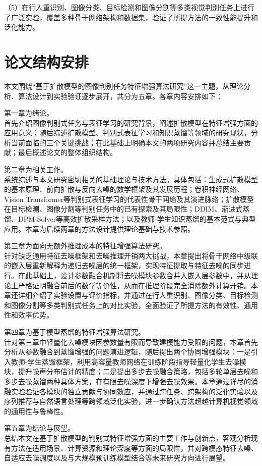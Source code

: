（5）在行人重识别、图像分类、目标检测和图像分割等多类视觉判别任务上进行了广泛实验，覆盖多种骨干网络架构和数据集，验证了所提方法的一致性能提升和泛化能力。

\section{论文结构安排}

本文围绕``基于扩散模型的图像判别任务特征增强算法研究''这一主题，从理论分析、算法设计到实验验证逐步展开，共分为五章。各章内容安排如下：

第一章为绪论。\\首先介绍图像判别式任务与表征学习的研究背景，阐述扩散模型在特征增强方面的应用意义；随后综述扩散模型、判别式表征学习和知识蒸馏等领域的研究现状，分析当前面临的三个关键挑战；在此基础上明确本文的两项研究内容并总结主要贡献；最后概述论文的整体组织结构。

第二章为相关工作。\\系统综述与本文研究密切相关的基础理论与技术方法。具体包括：生成式扩散模型的基本原理、前向扩散与反向去噪的数学框架及其发展历程；卷积神经网络、Vision Transformer等判别式表征学习的代表性骨干网络及其演进脉络；扩散模型在目标检测、图像分割等判别任务中的已有探索及其局限性；DDIM、渐进式蒸馏、DPM-Solver等高效扩散采样方法；以及教师-学生知识蒸馏的基本范式与典型应用。本章为后续两章的方法设计提供理论基础与技术参照。

第三章为面向无额外推理成本的特征增强算法研究。\\针对缺乏通用特征去噪框架和去噪推理开销两大挑战，本章提出将骨干网络中级联的嵌入层重新解释为递归去噪层的统一框架，实现特征提取与特征去噪的同步进行。在此基础上，设计参数融合机制将去噪模块参数合并入嵌入层参数中，并从理论上严格证明融合前后的数学等价性，从而在推理阶段完全消除额外计算开销。本章还详细介绍了实验设置与评价指标，并通过在行人重识别、图像分类、目标检测和图像分割等多类判别式任务上的对比实验，全面验证了所提方法的有效性、通用性和效率优势。

第四章为基于模型蒸馏的特征增强算法研究。\\针对第三章中轻量化去噪模块因参数量有限而导致建模能力受限的问题，本章首先分析从参数融合到蒸馏增强的问题演进逻辑，随后提出两个协同增强模块：一是引入教师-学生蒸馏框架，利用高容量教师网络在训练阶段指导轻量化学生去噪模块，提升噪声分布估计的精度；二是提出多步去噪融合策略，包括多轮单层去噪和多步去噪蒸馏两种具体方案，在有限去噪深度下增强去噪效果。本章通过详尽的消融实验验证各模块的独立贡献与协同效应，并通过跨任务、跨架构的泛化实验以及序列推荐与自然语言处理等跨领域泛化实验，进一步确认方法超越计算机视觉领域的通用性与鲁棒性。

第五章为结论与展望。\\总结本文在基于扩散模型的判别式特征增强方面的主要工作与创新点，客观分析现有方法在适用场景、计算资源和理论深度等方面的局限性，并对跨模态特征去噪、自适应去噪调度以及与大规模预训练模型结合等未来研究方向进行展望。